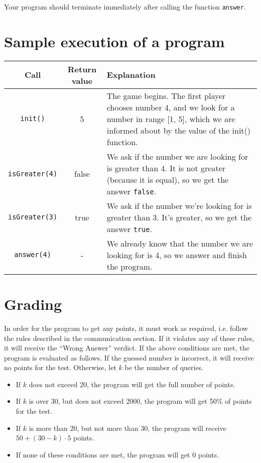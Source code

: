 \documentclass{spiral}
\begin{document}
    Your program should terminate immediately
    after calling the function \texttt{answer}.


\section{Sample execution of a program}

    \begin{tabular}{|c|c|p{12.5cm}|}
        \hline

        \textbf{Call} & \textbf{Return value} & \textbf{Explanation} \\ \hline

        \texttt{init()} & 5 &
        The game begins. The first player chooses number 4,
        and we look for a number in range [1, 5],
        which we are informed about by the value of the init() function.
        \\ \hline

        \texttt{isGreater(4)} & false &
        We ask if the number we are looking for is greater than 4.
        It is not greater (because it is equal),
        so we get the answer \texttt{false}.  
        \\ \hline

        \texttt{isGreater(3)} & true &
        We ask if the number we're looking for is greater than 3.
        It's greater, so we get the answer \texttt{true}.  
        \\ \hline

        \texttt{answer(4)} & - &
        We already know that the number we are looking for is 4,
        so we answer and finish the program.
        \\ \hline
    \end{tabular}



    \section{Grading}

    In order for the program to get any points, it must work as required,
    i.e. follow the rules described in the communication section.
    If it violates any of these rules, it will receive the ``Wrong Answer'' verdict.
    If the above conditions are met, the program is evaluated as follows.
    If the guessed number is incorrect, it will receive no points for the test.
    Otherwise, let $k$ be the number of queries.
    \begin{itemize}
        \item If $k$ does not exceed 20, the program will get
            the full number of points.
        \item If $k$ is over 30, but does not exceed 2000, the program will get
            50\% of points for the test.
        \item If $k$ is more than 20, but not more than 30,
            the program will receive $50 + (30 - k) \cdot 5$ points.
        \item If none of these conditions are met, the program will get 0 points.
    \end{itemize}
\end{document}
